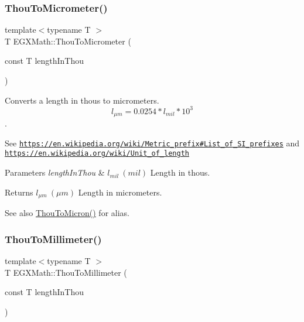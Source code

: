 \subsubsection{\texorpdfstring{Thou\+To\+Micrometer()}{ThouToMicrometer()}}
{\footnotesize\ttfamily template$<$typename T $>$ \\
T E\+G\+X\+Math\+::\+Thou\+To\+Micrometer (\begin{DoxyParamCaption}\item[{const T}]{length\+In\+Thou }\end{DoxyParamCaption})}



Converts a length in thous to micrometers. \[ l_{\mu m}=0.0254 * l_{mil} * 10^{3} \]. 

See \href{https://en.wikipedia.org/wiki/Metric_prefix#List_of_SI_prefixes}{\tt https\+://en.\+wikipedia.\+org/wiki/\+Metric\+\_\+prefix\#\+List\+\_\+of\+\_\+\+S\+I\+\_\+prefixes} and \href{https://en.wikipedia.org/wiki/Unit_of_length}{\tt https\+://en.\+wikipedia.\+org/wiki/\+Unit\+\_\+of\+\_\+length} 
\begin{DoxyParams}{Parameters}
{\em length\+In\+Thou} & $ l_{mil}\ (mil)$ Length in thous. \\
\hline
\end{DoxyParams}
\begin{DoxyReturn}{Returns}
$ l_{\mu m}\ (\mu m)$ Length in micrometers. 
\end{DoxyReturn}
\begin{DoxySeeAlso}{See also}
\mbox{\hyperlink{group___e_g_x_math-_conversions-_length_conversions-_imperial-_thou-_non-_s_i_ga7f43c9a1cbb845911bdcbbbe388347a1}{Thou\+To\+Micron()}} for alias. 
\end{DoxySeeAlso}
\mbox{\label{group___e_g_x_math-_conversions-_length_conversions-_imperial-_thou-_s_i_ga0fc7339abd95e8c5abaed9fee95bafbb}} 
\subsubsection{\texorpdfstring{Thou\+To\+Millimeter()}{ThouToMillimeter()}}
{\footnotesize\ttfamily template$<$typename T $>$ \\
T E\+G\+X\+Math\+::\+Thou\+To\+Millimeter (\begin{DoxyParamCaption}\item[{const T}]{length\+In\+Thou }\end{DoxyParamCaption})}



